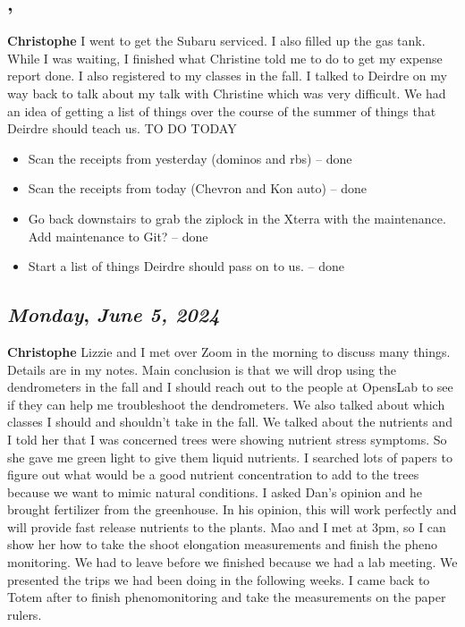\subsection*{\weekday, \day}
\textbf {Christophe}
I went to get the Subaru serviced. I also filled up the gas tank. While I was waiting, I finished what Christine told me to do to get my expense report done. I also registered to my classes in the fall. I talked to Deirdre on my way back to talk about my talk with Christine which was very difficult. We had an idea of getting a list of things over the course of the summer of things that Deirdre should teach us.
TO DO TODAY
\begin{itemize}
    \item Scan the receipts from yesterday (dominos and rbs) -- done 
    \item Scan the receipts from today (Chevron and Kon auto) -- done
    \item Go back downstairs to grab the ziplock in the Xterra with the maintenance. Add maintenance to Git? -- done 
    \item Start a list of things Deirdre should pass on to us. -- done 
\end{itemize}

\def\day{\textit{June 5, 2024}}
\def\weekday{\textit{Monday}}
\subsection*{\weekday, \day}
\textbf {Christophe}
Lizzie and I met over Zoom in the morning to discuss many things. Details are in my notes. Main conclusion is that we will drop using the dendrometers in the fall and I should reach out to the people at OpensLab to see if they can help me troubleshoot the dendrometers. We also talked about which classes I should and shouldn't take in the fall. We talked about the nutrients and I told her that I was concerned trees were showing nutrient stress symptoms. So she gave me green light to give them liquid nutrients. I searched lots of papers to figure out what would be a good nutrient concentration to add to the trees because we want to mimic natural conditions. I asked Dan's opinion and he brought fertilizer from the greenhouse. In his opinion, this will work perfectly and will provide fast release nutrients to the plants. 
Mao and I met at 3pm, so I can show her how to take the shoot elongation measurements and finish the pheno monitoring. We had to leave before we finished because we had a lab meeting. We presented the trips we had been doing in the following weeks. I came back to Totem after to finish phenomonitoring and take the measurements on the paper rulers. 



